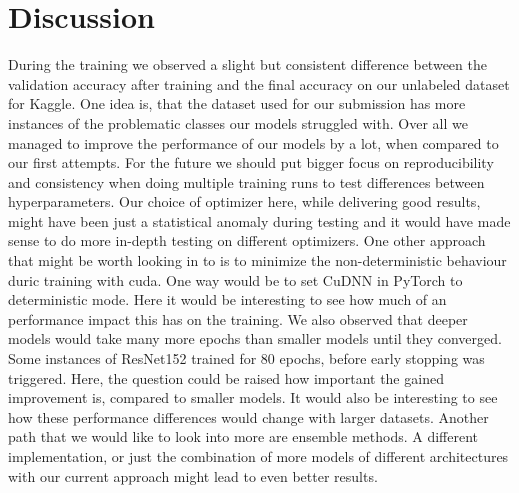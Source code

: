\section{Discussion}\label{discussion}

\label{ResNetDiscussion}
During the training we observed a slight but consistent difference between the validation accuracy after training and the final accuracy on our unlabeled dataset for Kaggle. One idea is, that the dataset used for our submission has more instances of the problematic classes our models struggled with. Over all we managed to improve the performance of our models by a lot, when compared to our first attempts. For the future we should put bigger focus on reproducibility and consistency when doing multiple training runs to test differences between hyperparameters. Our choice of optimizer here, while delivering good results, might have been just a statistical anomaly during testing and it would have made sense to do more in-depth testing on different optimizers. One other approach that might be worth looking in to is to minimize the non-deterministic behaviour duric training with cuda. One way would be to set CuDNN in PyTorch to deterministic mode. Here it would be interesting to see how much of an performance impact this has on the training. We also observed that deeper models would take many more epochs than smaller models until they converged. Some instances of ResNet152 trained for 80 epochs, before early stopping was triggered. Here, the question could be raised how important the gained improvement is, compared to smaller models. It would also be interesting to see how these performance differences would change with larger datasets. Another path that we would like to look into more are ensemble methods. A different implementation, or just the combination of more models of different architectures with our current approach might lead to even better results. 